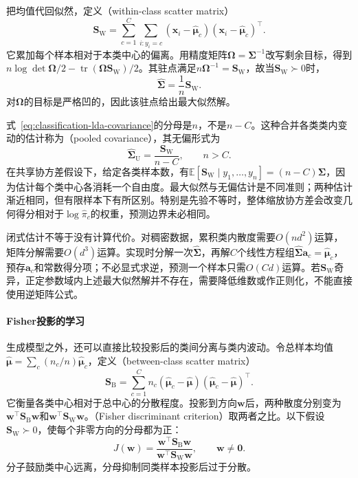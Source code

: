把均值代回似然，定义（within-class scatter matrix）
\begin{equation}
  \label{eq:classification-lda-within}
  \bm{S}_{\mathrm{W}}
    =\sum_{c=1}^{C}\sum_{i:y_i=c}
      (\bm{x}_i-\hat{\bm{\mu}}_c)
      (\bm{x}_i-\hat{\bm{\mu}}_c)^{\top}.
\end{equation}
它累加每个样本相对于本类中心的偏离。用精度矩阵$\bm{\Omega}=\bm{\Sigma}^{-1}$改写剩余目标，得到$n\log\det\bm{\Omega}/2-\operatorname{tr}(\bm{\Omega}\bm{S}_{\mathrm{W}})/2$。其驻点满足$n\bm{\Omega}^{-1}=\bm{S}_{\mathrm{W}}$，故当$\bm{S}_{\mathrm{W}}\succ0$时，
\begin{equation}
  \label{eq:classification-lda-covariance}
  \hat{\bm{\Sigma}}=\frac1n\bm{S}_{\mathrm{W}} .
\end{equation}
对$\bm{\Omega}$的目标是严格凹的，因此该驻点给出最大似然解。

式~\eqref{eq:classification-lda-covariance}的分母是$n$，不是$n-C$。这种合并各类类内变动的估计称为（pooled covariance），其无偏形式为
\[
  \hat{\bm{\Sigma}}_{\mathrm{U}}
    =\frac{\bm{S}_{\mathrm{W}}}{n-C},\qquad n>C .
\]
在共享协方差假设下，给定各类样本数，有$\mathbb{E}[\bm{S}_{\mathrm{W}}\mid y_1,\ldots,y_n]=(n-C)\bm{\Sigma}$，因为估计每个类中心各消耗一个自由度。最大似然与无偏估计是不同准则；两种估计渐近相同，但有限样本下有所区别。特别是先验不等时，整体缩放协方差会改变几何得分相对于$\log\hat\pi_c$的权重，预测边界未必相同。

闭式估计不等于没有计算代价。对稠密数据，累积类内散度需要$O(nd^2)$运算，矩阵分解需要$O(d^3)$运算。实现时分解一次$\hat{\bm{\Sigma}}$，再解$C$个线性方程组$\hat{\bm{\Sigma}}\bm{a}_c=\hat{\bm{\mu}}_c$，预存$\bm{a}_c$和常数得分项；不必显式求逆，预测一个样本只需$O(Cd)$运算。若$\bm{S}_{\mathrm{W}}$奇异，正定参数域内上述最大似然解并不存在，需要降低维数或作正则化，不能直接使用逆矩阵公式。

\paragraph{Fisher投影的学习}
生成模型之外，还可以直接比较投影后的类间分离与类内波动。令总样本均值$\hat{\bm{\mu}}=\sum_c(n_c/n)\hat{\bm{\mu}}_c$，定义（between-class scatter matrix）
\[
  \bm{S}_{\mathrm{B}}
    =\sum_{c=1}^{C}n_c
      (\hat{\bm{\mu}}_c-\hat{\bm{\mu}})
      (\hat{\bm{\mu}}_c-\hat{\bm{\mu}})^{\top}.
\]
它衡量各类中心相对于总中心的分散程度。投影到方向$\bm{w}$后，两种散度分别变为$\bm{w}^{\top}\bm{S}_{\mathrm{B}}\bm{w}$和$\bm{w}^{\top}\bm{S}_{\mathrm{W}}\bm{w}$。（Fisher discriminant criterion）取两者之比。以下假设$\bm{S}_{\mathrm{W}}\succ0$，使每个非零方向的分母都为正：
\begin{equation}
  \label{eq:classification-fisher-criterion}
  J(\bm{w})
    =\frac{\bm{w}^{\top}\bm{S}_{\mathrm{B}}\bm{w}}
      {\bm{w}^{\top}\bm{S}_{\mathrm{W}}\bm{w}},
    \qquad \bm{w}\ne\bm{0}.
\end{equation}
分子鼓励类中心远离，分母抑制同类样本投影后过于分散。

